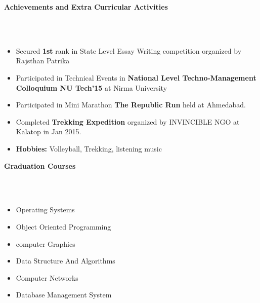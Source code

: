 \documentclass[a4paper,10pt]{article}
\newcommand{\lsep}{-0.5cm}
\newcommand{\resheading}[1]{{\small \colorbox{mygrey}{\begin{minipage}{0.975\textwidth}{\textbf{#1 \vphantom{p\^{E}}}}\end{minipage}}}}
\begin{document}
\resheading{\textbf{\large Achievements and Extra Curricular Activities}}\\[\lsep]\\[-0.3cm]
\begin{itemize}
  \item Secured \textbf{1st} rank in State Level Essay Writing competition organized by Rajsthan Patrika
  	\item Participated in Technical Events in\textbf{ National Level Techno-Management Colloquium  NU Tech'15 } at Nirma University
  	\item Participated in Mini Marathon \textbf{The Republic Run}  held at Ahmedabad.
  \item Completed \textbf{Trekking Expedition} organized by INVINCIBLE NGO at Kalatop in Jan 2015.
  \item \textbf{Hobbies:} Volleyball, Trekking, listening music
\end{itemize}





\resheading{\textbf{\large Graduation Courses }}\\[\lsep]\\[0.3cm]
	\noindent\begin{minipage}{.60\textwidth}
		\begin{itemize}
			\item Operating Systems\\[-0.6cm]
			\item Object Oriented Programming\\[-0.6cm]
			\item computer Graphics\\[-0.5cm]
			
			
		\end{itemize}
	\end{minipage} 
	\noindent\begin{minipage}{.40\textwidth}
		\begin{itemize}
			\item Data Structure And Algorithms\\[-0.6cm]
			\item Computer Networks\\[-0.6cm]
			\item Database Management System\\[-0.5cm]
					
		\end{itemize}
	\end{minipage}
\end{document}
